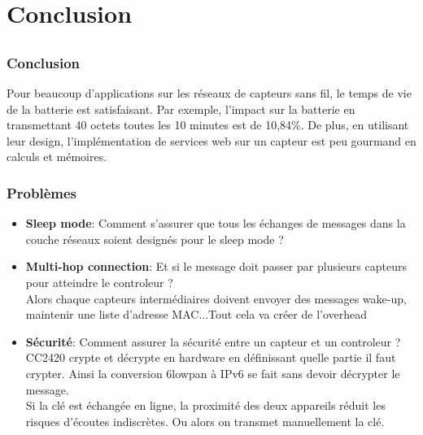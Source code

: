 \section{Conclusion}
\subsection{}
\begin{frame}
 \frametitle{Conclusion}
 Pour beaucoup d'applications sur les réseaux de capteurs sans fil, le temps de vie de la batterie est satisfaisant.
 Par exemple, l'impact sur la batterie en transmettant 40 octets toutes les 10 minutes est de 10,84\%.
 De plus, en utilisant leur design, l'implémentation de services web sur un capteur est peu gourmand en calculs et mémoires.
\end{frame}

\begin{frame}
 \frametitle{Problèmes}
 \begin{itemize}
  \item \textbf{Sleep mode}: Comment s'assurer que tous les échanges de messages dans la couche réseaux soient designés pour le sleep mode ?
  \item \textbf{Multi-hop connection}: Et si le message doit passer par plusieurs capteurs pour atteindre le controleur ?\\
  Alors chaque capteurs intermédiaires doivent envoyer des messages wake-up, maintenir une liste d'adresse MAC...Tout cela va créer de l'overhead
  \item \textbf{Sécurité}: Comment assurer la sécurité entre un capteur et un controleur ?\\
  CC2420 crypte et décrypte en hardware en définissant quelle partie il faut crypter.
  Ainsi la conversion 6lowpan à IPv6 se fait sans devoir décrypter le message.\\
  Si la clé est échangée en ligne, la proximité des deux appareils réduit les risques d'écoutes indiscrètes.
  Ou alors on transmet manuellement la clé.
 \end{itemize}
\end{frame}
